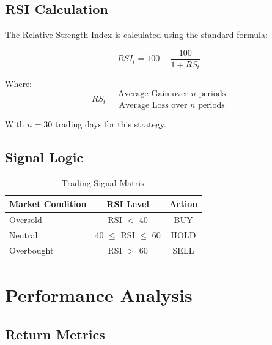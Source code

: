 \documentclass[11pt,a4paper]{article}
\begin{document}
\subsection{RSI Calculation}

The Relative Strength Index is calculated using the standard formula:

\begin{equation}
RSI_t = 100 - \frac{100}{1 + RS_t}
\end{equation}

Where:
\begin{equation}
RS_t = \frac{\text{Average Gain over } n \text{ periods}}{\text{Average Loss over } n \text{ periods}}
\end{equation}

With $n = 30$ trading days for this strategy.

\subsection{Signal Logic}

\begin{table}[H]
\centering
\begin{tabular}{lcc}
\toprule
\textbf{Market Condition} & \textbf{RSI Level} & \textbf{Action} \\
\midrule
Oversold & RSI $<$ 40 & \textcolor{profit}{BUY} \\
Neutral & 40 $\leq$ RSI $\leq$ 60 & HOLD \\
Overbought & RSI $>$ 60 & \textcolor{loss}{SELL} \\
\bottomrule
\end{tabular}
\caption{Trading Signal Matrix}
\end{table}

\vspace{1cm}  

\section{Performance Analysis}

\subsection{Return Metrics}
\end{document}
